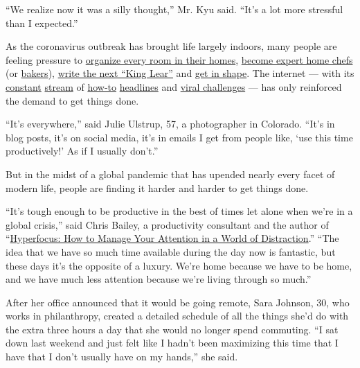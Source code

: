 ``We realize now it was a silly thought,'' Mr. Kyu said. ``It's a lot
more stressful than I expected.''

As the coronavirus outbreak has brought life largely indoors, many
people are feeling pressure to
\href{https://www.nytimes3xbfgragh.onion/programs/home-organization/}{organize
every room in their homes},
\href{https://www.vox.com/the-goods/2020/3/27/21195361/quarantine-recipes-cooking-baking-coronavirus-bread}{become
expert home chefs} (or
\href{https://www.nytimes3xbfgragh.onion/2020/03/30/style/bread-baking-coronavirus.html}{bakers}),
\href{https://twitter.com/rosannecash/status/1238700345548627969}{write
the next ``King Lear''} and
\href{https://www.nytimes3xbfgragh.onion/2020/03/20/style/self-care/isolation-exercise-meditation-coronavirus.html}{get
in shape}. The internet --- with its
\href{https://www.elle.com/culture/career-politics/a31671089/coronavirus-staying-at-home-tips/}{constant}
\href{https://www.forbes.com/sites/averyblank/2020/03/23/3-ways-professionals-can-stay-productive-during-the-coronavirus-outbreak/}{stream}
of
\href{https://www.wired.com/story/time-to-do-the-things-you-keep-putting-off/}{how-to}
\href{https://www.inc.com/andrew-thomas/8-ways-to-stay-productive-during-coronavirus.html}{headlines}
and
\href{https://www.nytimes3xbfgragh.onion/2020/03/26/style/viral-challenges-coronavirus.html}{viral
challenges} --- has only reinforced the demand to get things done.

``It's everywhere,'' said Julie Ulstrup, 57, a photographer in Colorado.
``It's in blog posts, it's on social media, it's in emails I get from
people like, `use this time productively!' As if I usually don't.''

But in the midst of a global pandemic that has upended nearly every
facet of modern life, people are finding it harder and harder to get
things done.

``It's tough enough to be productive in the best of times let alone when
we're in a global crisis,'' said Chris Bailey, a productivity consultant
and the author of
``\href{https://www.penguinrandomhouse.com/books/562033/hyperfocus-by-chris-bailey/9780525522256/}{Hyperfocus:
How to Manage Your Attention in a World of Distraction}.'' ``The idea
that we have so much time available during the day now is fantastic, but
these days it's the opposite of a luxury. We're home because we have to
be home, and we have much less attention because we're living through so
much.''

After her office announced that it would be going remote, Sara Johnson,
30, who works in philanthropy, created a detailed schedule of all the
things she'd do with the extra three hours a day that she would no
longer spend commuting. ``I sat down last weekend and just felt like I
hadn't been maximizing this time that I have that I don't usually have
on my hands,'' she said.

